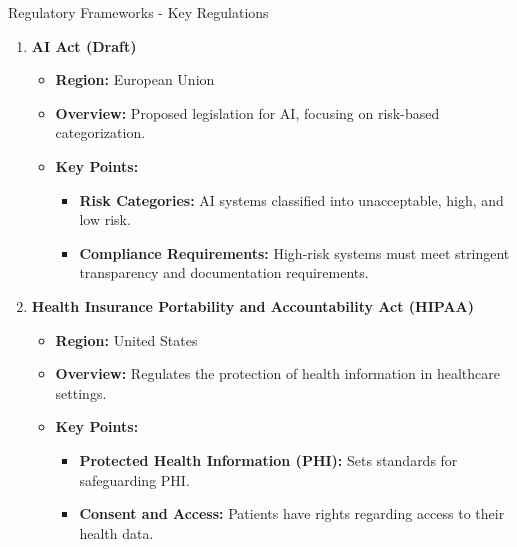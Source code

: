 \documentclass[aspectratio=169]{beamer}
\begin{document}
\begin{frame}[fragile]{Regulatory Frameworks - Key Regulations}
\begin{enumerate}
        \item \textbf{AI Act (Draft)}
            \begin{itemize}
                \item \textbf{Region:} European Union
                \item \textbf{Overview:} Proposed legislation for AI, focusing on risk-based categorization.
                \item \textbf{Key Points:}
                \begin{itemize}
                    \item \textbf{Risk Categories:} AI systems classified into unacceptable, high, and low risk.
                    \item \textbf{Compliance Requirements:} High-risk systems must meet stringent transparency and documentation requirements.
                \end{itemize}
            \end{itemize}
        
        \item \textbf{Health Insurance Portability and Accountability Act (HIPAA)}
            \begin{itemize}
                \item \textbf{Region:} United States
                \item \textbf{Overview:} Regulates the protection of health information in healthcare settings.
                \item \textbf{Key Points:}
                \begin{itemize}
                    \item \textbf{Protected Health Information (PHI):} Sets standards for safeguarding PHI.
                    \item \textbf{Consent and Access:} Patients have rights regarding access to their health data.
                \end{itemize}
            \end{itemize}
    \end{enumerate}
\end{frame}
\end{document}
